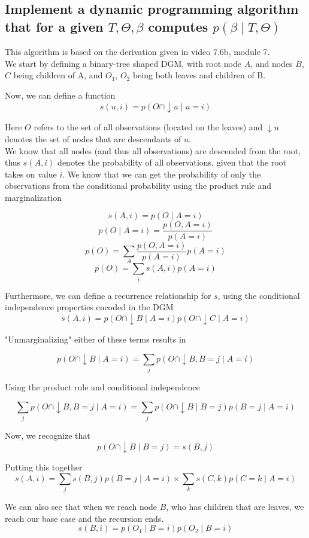 \documentclass[11pt,a4paper]{article}
\begin{document}
\subsection{Implement a dynamic programming algorithm that for a given $T, \Theta, \beta$ computes $p(\beta \mid T, \Theta)$}

This algorithm is based on the derivation given in video 7.6b, module 7.\\

We start by defining a binary-tree shaped DGM, with root node $A$,  and nodes $B$, $C$ being children of A, and $O_{1}$, $O_{2}$ being both leaves and children of B.

Now, we can define a function $$s(u, i) = p(O \cap\downarrow u \mid u = i) $$

Here $O$ refers to the set of all observations (located on the leaves) and $\downarrow u$ denotes the set of nodes that are descendants of $u$.\\

We know that all nodes (and thus all observations) are descended from the root, thus $s(A, i)$ denotes the probability of all observations, given that the root takes on value $i$. We know that we can get the probability of only the observations from the conditional probability using the product rule and marginalization

$$s(A, i) = p(O \mid A = i)$$
$$p(O \mid A = i) = \frac{p(O, A = i)}{p(A = i)} $$
$$p(O) = \sum_{A} \frac{p(O, A = i)}{p(A = i)}p(A = i)$$
$$p(O) = \sum_{i} s(A, i)p(A=i)$$

Furthermore, we can define a recurrence relationship for $s$, using the conditional independence properties encoded in the DGM
$$s(A, i) = p(O \cap\downarrow B \mid A = i)p(O \cap\downarrow C \mid A = i)$$

"Unmarginalizing" either of these terms results in

$$p(O \cap\downarrow B \mid A = i) = \sum_{j} p(O \cap\downarrow B, B = j \mid A = i)$$

Using the product rule and conditional independence

$$ \sum_{j} p(O \cap\downarrow B, B = j \mid A = i) =  \sum_{j} p(O \cap\downarrow B \mid B = j)p(B = j \mid A = i)$$

Now, we recognize that
$$ p(O \cap\downarrow B \mid B = j) = s(B, j)$$

Putting this together
$$s(A, i) = \sum_{j}s(B, j)p(B = j \mid A = i) \times \sum_{k} s(C, k)p(C = k \mid A = i)$$

We can also see that when we reach node $B$, who has children that are leaves, we reach our base case and the recursion ends.
$$s(B, i) = p(O_{1} \mid B = i)p(O_{2} \mid B = i)$$
\end{document}
